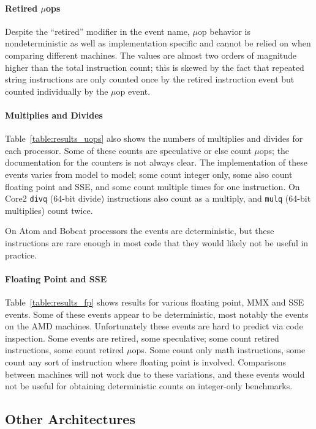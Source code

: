 \paragraph{Retired $\mu$ops}
Despite the ``retired'' modifier in the event name, 
$\mu$op behavior is nondeterministic as well as implementation
specific and cannot be relied on when comparing different machines.
The values are almost two orders of magnitude higher than the 
total instruction count; this is skewed by the fact that repeated
string instructions are only counted once by the retired instruction
event but counted individually by the $\mu$op event.

\paragraph{Multiplies and Divides}
Table~\ref{table:results_uops} also shows the numbers of 
multiplies and divides for each processor.  
Some of these counts are speculative or else count $\mu$ops; 
the documentation for the counters is not always clear.  
The implementation of these events varies from model to model;
some count integer only, some also count floating point and SSE, and some count
multiple times for one instruction.  
On Core2 {\tt divq} (64-bit divide) instructions also count as a multiply, 
and {\tt mulq} (64-bit multiplies) count twice.

On Atom and Bobcat processors the events are deterministic, but
these instructions are rare enough in most code that they
would likely not be useful in practice.

\paragraph{Floating Point and SSE}
Table~\ref{table:results_fp} shows results for various floating point,
MMX and SSE events.  Some of these events appear 
to be deterministic,
most notably the events on the AMD machines.  Unfortunately these events
are hard to predict via code inspection.  Some events are retired,
some speculative; some count retired instructions, some count retired
$\mu$ops.  Some count only math instructions, some count any sort
of instruction where floating point is involved.  Comparisons
between machines will not work due to these variations, and 
these events would not be useful for obtaining deterministic counts 
on integer-only benchmarks. 

\subsection{Other Architectures}

